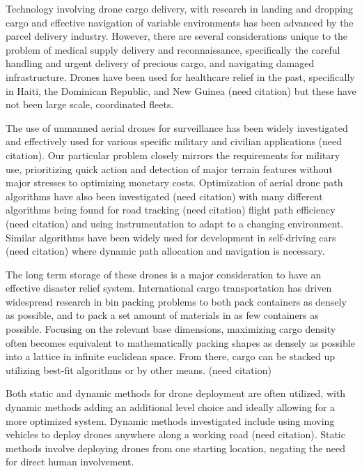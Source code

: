 \documentclass[twocolumn,10pt]{asme2ej}
\begin{document}
Technology involving drone cargo delivery, with research in landing and dropping cargo and effective navigation of variable environments has been advanced by the parcel delivery industry. However, there are several considerations unique to the problem of medical supply delivery and reconnaissance, specifically the careful handling and urgent delivery of precious cargo, and navigating damaged infrastructure. Drones have been used for healthcare relief in the past, specifically in Haiti, the Dominican Republic, and New Guinea (need citation) but these have not been large scale, coordinated fleets.

The use of unmanned aerial drones for surveillance has been widely investigated and effectively used for various specific military and civilian applications (need citation). Our particular problem closely mirrors the requirements for military use, prioritizing quick action and detection of major terrain features without major stresses to optimizing monetary costs. Optimization of aerial drone path algorithms have also been investigated (need citation) with many different algorithms being found for road tracking (need citation) flight path efficiency (need citation) and using instrumentation to adapt to a changing environment. Similar algorithms have been widely used for development in self-driving cars (need citation) where dynamic path allocation and navigation is necessary.

The long term storage of these drones is a major consideration to have an effective disaster relief system. International cargo transportation has driven widespread research in bin packing problems to both pack containers as densely as possible, and to pack a set amount of materials in as few containers as possible. Focusing on the relevant base dimensions, maximizing cargo density often becomes equivalent to mathematically packing shapes as densely as possible into a lattice in infinite euclidean space. From there, cargo can be stacked up utilizing best-fit algorithms or by other means. (need citation)

Both static and dynamic methods for drone deployment are often utilized, with dynamic methods adding an additional level choice and ideally allowing for a more optimized system. Dynamic methods investigated include using moving vehicles to deploy drones anywhere along a working road (need citation). Static methods involve deploying drones from one starting location, negating the need for direct human involvement.
\end{document}
